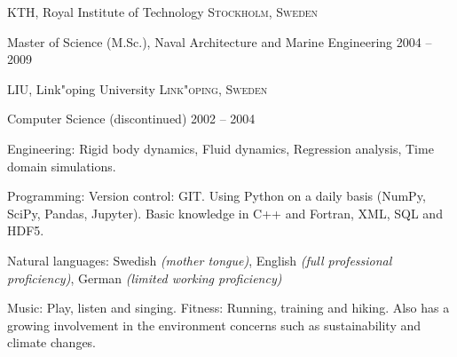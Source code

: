 \documentclass[10pt,a4paper]{article} %
\begin{document}

\headedsection %
{KTH, Royal Institute of Technology}
{\textsc{Stockholm, Sweden}} {

\headedsubsection %
{Master of Science (M.Sc.), Naval Architecture and Marine Engineering}
{2004 -- 2009}
{\bodytext{ }}
}


\headedsection %
{LIU, Link"oping University}
{\textsc{Link"oping, Sweden}} {

\headedsubsection %
{Computer Science \textnormal{(discontinued)}}
{2002 -- 2004} {}
}


\spacedhrule{0.5em}{-0.4em} %



\inlineheadsection %
{Engineering:}
{Rigid body dynamics, Fluid dynamics, Regression analysis, Time domain simulations.}

\inlineheadsection %
{Programming:}
{
Version control: GIT.
Using Python on a daily basis (NumPy, SciPy, Pandas, Jupyter).
Basic knowledge in C++ and Fortran, XML, SQL and HDF5.
}


\inlineheadsection %
{Natural languages:}
{Swedish \textit{(mother tongue)}, English \textit{(full professional proficiency)}, German \textit{(limited working proficiency)}}


\spacedhrule{1.6em}{-0.4em} %


Music: Play, listen and singing. Fitness: Running, training and hiking. Also has a growing involvement in the environment concerns such as sustainability and climate changes. 

\end{document}
